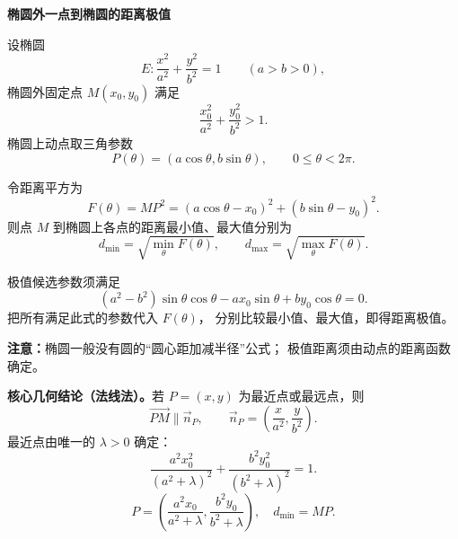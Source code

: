\begin{statementbox}
\textbf{椭圆外一点到椭圆的距离极值}

设椭圆
\[
E:\frac{x^2}{a^2}+\frac{y^2}{b^2}=1\qquad(a>b>0),
\]
椭圆外固定点 $M(x_0,y_0)$ 满足
\[
\frac{x_0^2}{a^2}+\frac{y_0^2}{b^2}>1.
\]
椭圆上动点取三角参数
\[
P(\theta)=(a\cos\theta,b\sin\theta),\qquad 0\le\theta<2\pi.
\]

令距离平方为
\[
F(\theta)=MP^2=(a\cos\theta-x_0)^2
                    +(b\sin\theta-y_0)^2.
\]
则点 $M$ 到椭圆上各点的距离最小值、最大值分别为
\[
\boxed{d_{\min}=\sqrt{\min_{\theta}F(\theta)},\qquad
       d_{\max}=\sqrt{\max_{\theta}F(\theta)}}.
\]

极值候选参数须满足
\[
\boxed{(a^2-b^2)\sin\theta\cos\theta
       -ax_0\sin\theta+by_0\cos\theta=0}.
\]
把所有满足此式的参数代入 $F(\theta)$，
分别比较最小值、最大值，即得距离极值。

\textbf{注意：}椭圆一般没有圆的“圆心距加减半径”公式；
极值距离须由动点的距离函数确定。

\medskip\textbf{核心几何结论（法线法）。}若 $P=(x,y)$ 为最近点或最远点，则
\[
\overrightarrow{PM}\parallel\vec n_P,\qquad \vec n_P=\left(\frac{x}{a^2},\frac{y}{b^2}\right).
\]
最近点由唯一的 $\lambda>0$ 确定：
\[
\boxed{\frac{a^2x_0^2}{(a^2+\lambda)^2}+\frac{b^2y_0^2}{(b^2+\lambda)^2}=1.}
\]
\[
P=\left(\frac{a^2x_0}{a^2+\lambda},\frac{b^2y_0}{b^2+\lambda}\right),\quad d_{\min}=MP.
\]


\end{statementbox}
